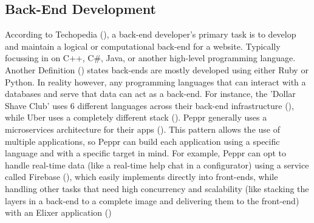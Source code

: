 \subsection{Back-End Development}
According to Techopedia (\cite{Back-End Developer Definition}), a back-end developer's primary task is to develop and maintain a logical or computational back-end for a website. Typically focussing in on C++, C\#, Java, or another high-level programming language.
Another Definition (\cite{Back-End Developer Definition 02}) states back-ends are mostly developed using either Ruby or Python.
In reality however, any programming languages that can interact with a databases and serve that data can act as a back-end. For instance, the 'Dollar Shave Club' uses 6 different languages across their back-end infrastructure (\cite{Dollar Shave Club back-end}), while Uber uses a completely different stack (\cite{Uber back-end}).
Peppr generally uses a microservices architecture for their apps (\cite{Microservices}). This pattern allows the use of multiple applications, so Peppr can build each application using a specific language and with a specific target in mind. For example, Peppr can opt to handle real-time data (like a real-time help chat in a configurator) using a service called Firebase (\cite{Firebase}), which easily implements directly into front-ends, while handling other tasks that need high concurrency and scalability (like stacking the layers in a back-end to a complete image and delivering them to the front-end) with an Elixer application (\cite{Elixr})

